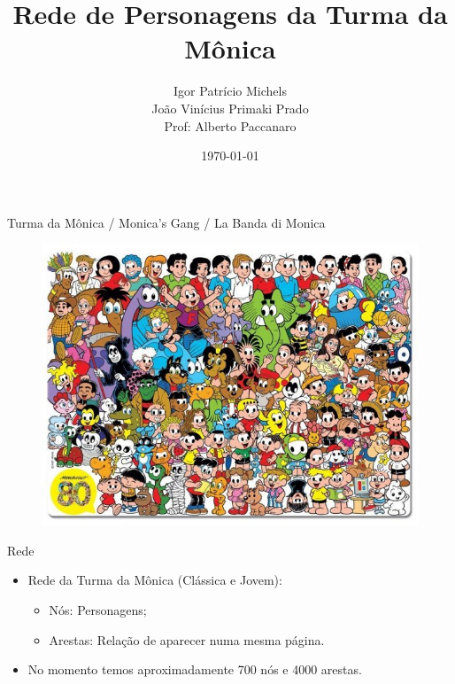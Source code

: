 \documentclass{beamer}
\title[Network Science]
{Rede de Personagens da Turma da Mônica}
\author[Igor Michels e João Primaki]
{
    Igor Patrício Michels \\
    João Vinícius Primaki Prado \\
    Prof: Alberto Paccanaro
}
\institute[FGV]
{
  Escola de Matemática Aplicada \\
  Fundação Getulio Vargas
}
\date[\today]
{\today}
\begin{document}
\begin{frame}
\titlepage
\end{frame} %

\begin{frame}{Turma da Mônica / Monica's Gang / La Banda di Monica}
\begin{figure}
    \centering
    \includegraphics[scale = 0.45]{img/tdm.jpg}
\end{figure}
\end{frame}

\begin{frame}{Rede}
\begin{itemize}
    \item Rede da Turma da Mônica (Clássica e Jovem):
    \begin{itemize}
        \vspace{12pt}
        \item Nós: Personagens;
        \vspace{12pt}
        \item Arestas: Relação de aparecer numa mesma página.
    \end{itemize}
    \vspace{24pt}
        
    \item No momento temos aproximadamente 700 nós e 4000 arestas.
\end{itemize}
\end{frame}
\end{document}
